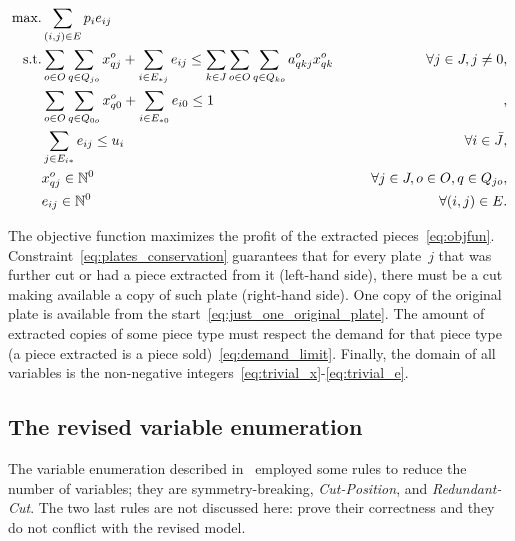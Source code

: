 \begin{align}
\mbox{max.} &\sum_{(i, j) \in E} p_i e_{ij} \label{eq:objfun}\\
\mbox{s.t.} &\sum_{o \in O}\sum_{q \in Q_{jo}} x^o_{qj} + \sum_{i \in E_{*j}} e_{ij} \leq \sum_{k \in J}\sum_{o \in O}\sum_{q \in Q_{ko}} a^o_{qkj} x^o_{qk} \hspace*{0.05\textwidth} & \forall j \in J, j \neq 0,\label{eq:plates_conservation}\\
	& \sum_{o \in O}\sum_{q \in Q_{0o}} x^o_{q0} + \sum_{i \in E_{*0}} e_{i0} \leq 1 &,\label{eq:just_one_original_plate}\\
	& \sum_{j \in E_{i*}} e_{ij} \leq u_i & \forall i \in \bar{J},\label{eq:demand_limit}\\
	& x^o_{qj} \in \mathbb{N}^0 & \forall j \in J, o \in O, q \in Q_{jo},\label{eq:trivial_x}\\
	& e_{ij} \in \mathbb{N}^0 & \forall (i, j) \in E.\label{eq:trivial_e}
\end{align}

The objective function maximizes the profit of the extracted pieces~\eqref{eq:objfun}.
Constraint~\eqref{eq:plates_conservation} guarantees that for every plate~\(j\) that was further cut or had a piece extracted from it (left-hand side), there must be a cut making available a copy of such plate (right-hand side).
One copy of the original plate is available from the start~\eqref{eq:just_one_original_plate}.
The amount of extracted copies of some piece type must respect the demand for that piece type (a piece extracted is a piece sold)~\eqref{eq:demand_limit}.
Finally, the domain of all variables is the non-negative integers~\eqref{eq:trivial_x}-\eqref{eq:trivial_e}.

\subsection{The revised variable enumeration}

The variable enumeration described in~\cite{furini:2016} employed some rules to reduce the number of variables; they are symmetry-breaking, \emph{Cut-Position}, and \emph{Redundant-Cut}.
The two last rules are not discussed here: \cite{furini:2016} prove their correctness and they do not conflict with the revised model.

